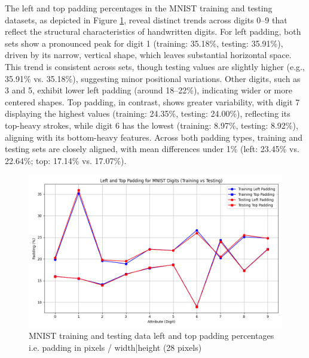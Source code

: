 The left and top padding percentages in the MNIST training and testing datasets, as depicted in Figure \ref{fig:MNIST_training_testing_padding_plots}, reveal distinct trends across digits 0–9 that reflect the structural characteristics of handwritten digits. For left padding, both sets show a pronounced peak for digit 1 (training: 35.18\%, testing: 35.91\%), driven by its narrow, vertical shape, which leaves substantial horizontal space. This trend is consistent across sets, though testing values are slightly higher (e.g., 35.91\% vs. 35.18\%), suggesting minor positional variations. Other digits, such as 3 and 5, exhibit lower left padding (around 18–22\%), indicating wider or more centered shapes. Top padding, in contrast, shows greater variability, with digit 7 displaying the highest values (training: 24.35\%, testing: 24.00\%), reflecting its top-heavy strokes, while digit 6 has the lowest (training: 8.97\%, testing: 8.92\%), aligning with its bottom-heavy features. Across both padding types, training and testing sets are closely aligned, with mean differences under 1\% (left: 23.45\% vs. 22.64\%; top: 17.14\% vs. 17.07\%). 


\begin{figure}[ht]
    \centering
    \includegraphics[width=0.99\columnwidth]{Figures/Results/HandwrittenCharacters/MNIST_training_testing_padding_plots.png}
    \caption{MNIST training and testing data left and top padding percentages i.e. padding in pixels / width|height (28 pixels)}
\label{fig:MNIST_training_testing_padding_plots}
\end{figure}


